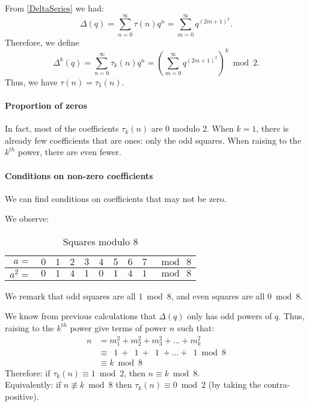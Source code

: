 From \ref{DeltaSeries} we had:
$$
\Delta(q) 
= \sum_{n=0}^{\infty} \tau(n)q^n
= \sum_{m=0}^{\infty} q^{(2m+1)^2}.
$$
Therefore, we define 
$$
\Delta^{k}(q) 
= \sum_{n=0}^{\infty} \tau_k(n)q^n
= \left( \sum_{m=0}^{\infty} q^{(2m+1)^2} \right)^k \bmod 2.
$$
Thus, we have $\tau(n)=\tau_1(n)$.

\paragraph{Proportion of zeros}
In fact, most of the coefficients $\tau_k(n)$ are $0$ modulo 2.
When $k=1$, there is already few coefficients that are ones: only the odd squares.
When raising to the $k^{th}$ power, there are even fewer.

\paragraph{Conditions on non-zero coefficients}
We can find conditions on coefficients that may not be zero.

We observe:
\begin{table}[!ht]

	\begin{center}
		\begin{tabular}{|r||c|c|c|c|c|c|c|c||l|}
			\hline
			$a=$ & $0$ & $1$ & $2$ & $3$ & $4$ & $5$ & $6$ & $7$ & $\bmod \ 8$ \\
			\hline
			$a^2=$ & \color{BrickRed} $0$ & \color{ForestGreen} $1$ & \color{BrickRed} $4$ & \color{ForestGreen} $1$ & \color{BrickRed} $0$ & \color{ForestGreen} $1$ & \color{BrickRed} $4$ & \color{ForestGreen} $1$ & $\bmod \ 8$ \\
			\hline

		\end{tabular}
	\end{center}
	\caption{Squares modulo $8$}
	\label{table:SquaresMod8}
\end{table}
We remark that odd squares are all $1 \bmod 8$, and even squares are all $0 \bmod 8$.

We know from previous calculations that $\Delta(q)$ only has odd powers of $q$.
Thus, raising to the $k^{th}$ power give terms of power $n$ such that:
\begin{align*}
n &= m_1^2 + m_2^2 + m_3^2 + \dots + m_k^2 \\
&\equiv \:\; 1 \ + \:\; 1 \ + \:\; 1 \; + \dots + \:\; 1 \bmod 8 \\
&\equiv k \bmod 8
\end{align*}
Therefore: if $\tau_k(n) \equiv 1 \bmod 2$, then $n \equiv k \bmod 8$.\\
Equivalently: if $n \not\equiv k \bmod 8$ then $\tau_k(n) \equiv 0 \bmod 2$ (by taking the contra-positive).

